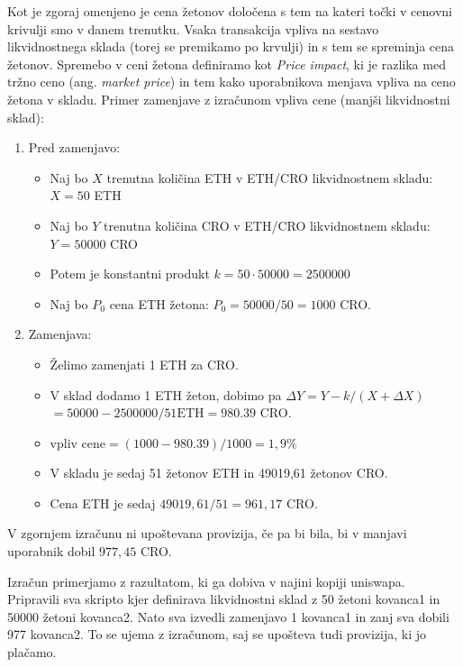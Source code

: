 \documentclass[a4paper,12pt]{article}%
\begin{document}
Kot je zgoraj omenjeno je cena žetonov določena s tem na kateri točki v cenovni krivulji smo v danem trenutku. Vsaka transakcija vpliva na sestavo likvidnostnega sklada (torej se premikamo po krvulji) in s tem se spreminja cena žetonov. Spremebo v ceni žetona definiramo kot \textit{Price impact}, ki je razlika med tržno ceno (ang. \textit{market price}) in tem kako uporabnikova menjava vpliva na ceno žetona v skladu. 
\newline
Primer zamenjave z izračunom vpliva cene (manjši likvidnostni sklad):
\begin{enumerate}
    \item Pred zamenjavo:
    \begin{itemize}
        \item Naj bo $X$ trenutna količina ETH v ETH/CRO likvidnostnem skladu: $X = 50$ ETH
        \item Naj bo $Y$ trenutna količina CRO v ETH/CRO likvidnostnem skladu: $Y = 50 000$ CRO 
        \item Potem je konstantni produkt $k = 50 \cdot 50 000 = 2 500 000$
        \item Naj bo $P_0$ cena ETH žetona: $P_0 = 50000/50 = 1000$ CRO. 
    \end{itemize}
    \item Zamenjava: 
    \begin{itemize}
        \item Želimo zamenjati 1 ETH za CRO.
        \item V sklad dodamo 1 ETH žeton, dobimo pa
        $\Delta Y = Y - k/(X+\Delta X) $ \newline $= 50 000 - 2 500 000/{51 \text{ETH}} = 980.39$ CRO.
        \item $\text{vpliv cene} = (1000 - 980.39)/1000 =  1,9 \%  $   
        \item V skladu je sedaj 51 žetonov ETH in 49019,61 žetonov CRO.   
        \item Cena ETH je sedaj $49019,61/51 = 961,17$ CRO.
    \end{itemize}
\end{enumerate}

V zgornjem izračunu ni upoštevana provizija, če pa bi bila, bi v manjavi uporabnik dobil $977,45$ CRO.

Izračun primerjamo z razultatom, ki ga dobiva v najini kopiji uniswapa. Pripravili sva skripto kjer definirava likvidnostni sklad z 50 žetoni kovanca1 in 50000 žetoni kovanca2. Nato sva izvedli zamenjavo 1 kovanca1 in zanj sva dobili 977 kovanca2. To se ujema z izračunom, saj se upošteva tudi provizija, ki jo plačamo. 
\end{document}
